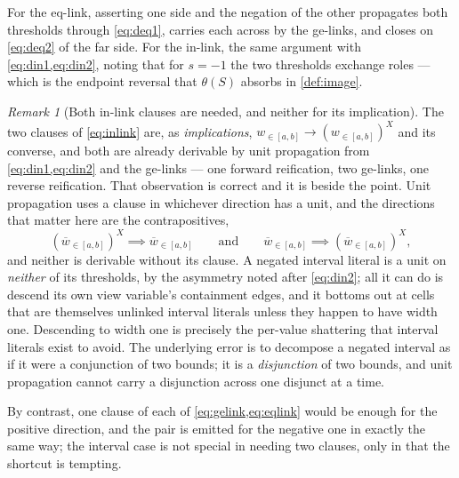 \documentclass[11pt,a4paper]{article}
\theoremstyle{plain}
\theoremstyle{definition}
\theoremstyle{remark}
\newtheorem{remarkN}{Remark}
\newcommand{\atin}[3]{#1_{\in[#2,#3]}}
\newcommand{\natin}[3]{\overline{#1}_{\in[#2,#3]}}
\begin{document}
For the eq-link, asserting one side and the negation of the other propagates both
thresholds through \cref{eq:deq1}, carries each across by the ge-links, and closes on
\cref{eq:deq2} of the far side.  For the in-link, the same argument with
\cref{eq:din1,eq:din2}, noting that for $s=-1$ the two thresholds exchange roles ---
which is the endpoint reversal that $\theta(S)$ absorbs in \cref{def:image}.

\begin{remarkN}[Both in-link clauses are needed, and neither for its implication]
\label{rem:bothlinks}
The two clauses of \cref{eq:inlink} are, as \emph{implications},
$\atin{w}{a}{b}\rightarrow(\atin{w}{a}{b})^X$ and its converse, and both are
already derivable by unit propagation from
\cref{eq:din1,eq:din2} and the ge-links --- one forward
reification, two ge-links, one reverse reification.  That observation is
correct and it is beside the point.  Unit propagation uses a clause in whichever
direction has a unit, and the directions that matter here are the
contrapositives,
\[
  (\natin{w}{a}{b})^{X} \implies \natin{w}{a}{b}
  \qquad\text{and}\qquad
  \natin{w}{a}{b} \implies (\natin{w}{a}{b})^{X},
\]
and neither is derivable without its clause.  A negated interval literal is a
unit on \emph{neither} of its thresholds, by the asymmetry noted after
\cref{eq:din2}; all it can do is descend its own view variable's containment
edges, and it bottoms out at cells that are themselves unlinked interval
literals unless they happen to have width one.  Descending to width one is
precisely the per-value shattering that interval literals exist to avoid.  The
underlying error is to decompose a negated interval as if it were a conjunction
of two bounds; it is a \emph{disjunction} of two bounds, and unit propagation
cannot carry a disjunction across one disjunct at a time.

By contrast, one clause of each of \cref{eq:gelink,eq:eqlink} would be enough
for the positive direction, and the pair is emitted for the negative one in
exactly the same way; the interval case is not special in needing two clauses,
only in that the shortcut is tempting.
\end{remarkN}
\end{document}
